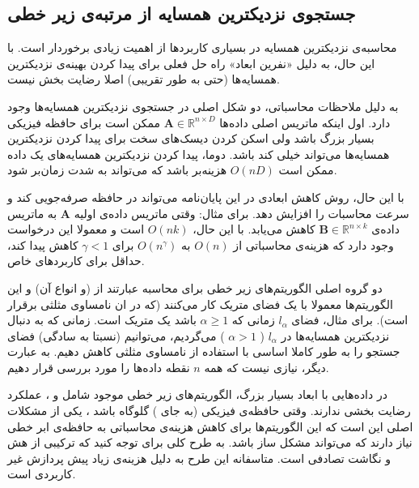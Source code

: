 \subsection{
جستجوی نزدیکترین همسایه از مرتبه‌ی زیر خطی
}

محاسبه‌ی نزدیکترین همسایه در بسیاری کاربردها از اهمیت زیادی برخوردار است. با این حال، به دلیل «نفرین ابعاد»%
راه حل فعلی برای پیدا کردن بهینه‌ی نزدیکترین همسایه‌ها (حتی به طور تقریبی) اصلا رضایت بخش نیست.
\cite{litez88, litez100}

به دلیل ملاحظات محاسباتی، دو شکل اصلی در جستجوی نزدیکترین همسایه‌ها وجود دارد. اول اینکه ماتریس اصلی داده‌ها 
$\mathbf{A} \in \mathbb{R}^{n \times D}$
ممکن است برای حافظه فیزیکی بسیار بزرگ باشد ولی اسکن کردن دیسک‌های سخت برای پیدا کردن نزدیکترین همسایه‌ها می‌تواند خیلی کند باشد. دوما، پیدا کردن نزدیکترین همسایه‌های یک داده ممکن است
$O(nD)$
هزینه‌بر باشد که می‌تواند به شدت زمان‌بر شود.

با این حال، روش کاهش ابعادی در این پایان‌نامه می‌تواند در حافظه صرفه‌جویی کند و سرعت محاسبات را افزایش دهد. برای مثال: وقتی ماتریس داده‌ی اولیه 
$\mathbf{A}$
به ماتریس داده‌ی 
$\mathbf{B} \in \mathbb{R}^{n \times k}$
کاهش می‌یابد. با این حال، 
$O(nk)$
 است و معمولا این درخواست وجود دارد که هزینه‌ی محاسباتی از 
$O(n)$
به 
$O(n^\gamma)$
برای 
$\gamma < 1$
کاهش پیدا کند، حداقل برای کاربردهای خاص.

دو گروه اصلی الگوریتم‌های زیر خطی برای محاسبه عبارتند از 
(و انواع آن)
\cite{litez79, litez80}
و 
%
\cite{litez15, litez56, litez100}
این الگوریتم‌ها معمولا با یک فضای متریک کار می‌کنند (که در ان نامساوی مثلثی برقرار است). برای مثال، فضای 
$l_\alpha$
زمانی که 
$\alpha \geq 1$
باشد یک متریک است. زمانی که به دنبال نزدیکترین‌ همسایه‌ها در 
$l_\alpha$
(%
$\alpha > 1$%
) می‌گردیم، می‌توانیم (نسبتا به سادگی) فضای جستجو را به طور کاملا اساسی با استفاده از نامساوی مثلثی کاهش دهیم. به عبارت دیگر، نیازی نیست که همه 
$n$
نقطه داده‌ها را مورد بررسی قرار دهیم.

در داده‌هایی با ابعاد بسیار بزرگ، الگوریتم‌های زیر خطی موجود شامل 
و 
، عملکرد رضایت بخشی ندارند.  وقتی حافظه‌ی فیزیکی (به جای 
%
) گلوگاه باشد%
، یکی از مشکلات اصلی این است که این الگوریتم‌ها برای کاهش هزینه‌ی محاسباتی به حافظه‌ی ابر خطی%
 نیاز دارند که می‌تواند مشکل ساز باشد.
\cite{litez100}
به طرح کلی برای 
توجه کنید که ترکیبی از هش%
و نگاشت تصادفی است. متاسفانه این طرح به دلیل هزینه‌ی زیاد پیش پردازش غیر کاربردی است.
\cite{litez100}

